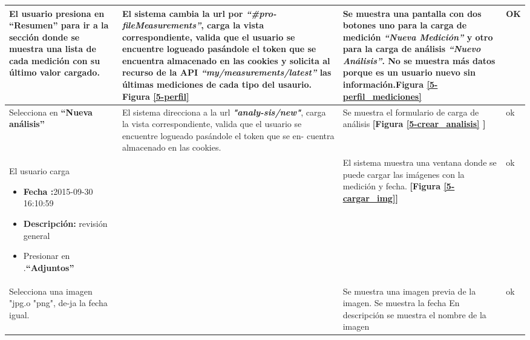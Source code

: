 \documentclass[a4paper,12pt]{article}
\begin{document}
\begin{longtable}{|p{4cm}|p{4cm}|p{4cm}|p{3cm}|}
El usuario presiona en \textbf{``Resumen'' } para ir a la sección donde se muestra una lista de cada medición con su último valor cargado.

& El sistema cambia la url por \textit{\textbf{``\#pro-fileMeasurements''}}, carga la vista correspondiente, valida que el usuario se encuentre logueado pasándole el token que se encuentra almacenado en las cookies y solicita al recurso de la API \textit{\textbf{``my/measurements/latest'' }}las últimas mediciones de cada tipo del usaurio. \textbf{Figura \ref{5-perfil}}

& Se muestra una pantalla con dos botones uno para la carga de medición
\textit{\textbf{``Nueva Medición'' }}y otro para la carga de análisis \textit{\textbf{``Nuevo Análisis''}}. No se muestra más datos porque es un usuario nuevo sin información.\textbf{Figura \ref{5-perfil_mediciones}}
& OK
\\ \hline



Selecciona en \textbf{``Nueva análisis'' }
& El sistema direcciona a la url \textit{\textbf{"analy-sis/new"}}, carga la vista correspondiente, valida que el usuario se encuentre logueado pasándole el token que se en-
cuentra almacenado en las cookies.

& Se muestra el formulario de carga de análisis \textbf{[Figura \ref{5-crear_analisis} ]}
& ok
\\ \hline



El usuario carga

\begin{itemize}
	\item \textbf{Fecha :}2015-09-30 16:10:59
	\item \textbf{Descripción: }revisión general
	\item Presionar en .\textbf{``Adjuntos''}

\end{itemize}

&
& El sistema muestra una ventana donde se puede cargar las imágenes con la medición y fecha.\textbf{ [Figura  \ref{5-cargar_img}]}
&ok

\\ \hline



Selecciona una imagen "jpg.o "png", de-ja la fecha igual. 
&
& Se muestra una imagen previa de la imagen. Se muestra la fecha En descripción se muestra el nombre de la imagen
& ok
\\ \hline
 

\end{longtable}
\end{document}

